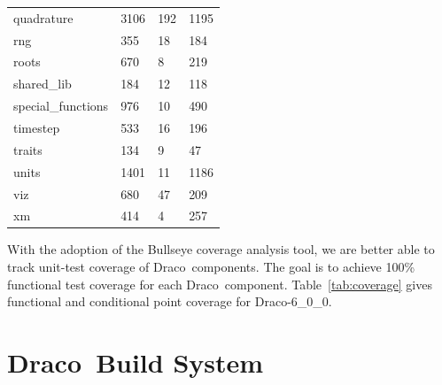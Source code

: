 \documentclass[note]{ResearchNote}
\newcommand{\draco}{Draco}
\newcommand{\dracor}{\draco-6\_0\_0}
\begin{document}
\begin{table}
\begin{center}
\begin{tabular}{llll}
      quadrature         &      3106     &      192      &      1195     \\
      rng                &       355     &       18      &       184     \\
      roots              &       670     &        8      &       219     \\
      shared\_lib        &       184     &       12      &       118     \\
      special\_functions &       976     &       10      &       490     \\
      timestep           &       533     &       16      &       196     \\
      traits             &       134     &       9       &       47      \\
      units              &      1401     &       11      &       1186    \\
      viz                &       680     &       47      &       209     \\
      xm                 &       414     &       4       &       257     \\
      \hline\hline
    \end{tabular}
  \end{center}
\end{table}





With the adoption of the \textsf{Bullseye} coverage analysis tool, we
are better able to track unit-test coverage of \draco\ components.
The goal is to achieve 100\% functional test coverage for each \draco\
component.  Table~\ref{tab:coverage} gives functional and conditional
point coverage for \dracor.



\section{\draco\ Build System}
\label{sec:dbs}
\end{document}
